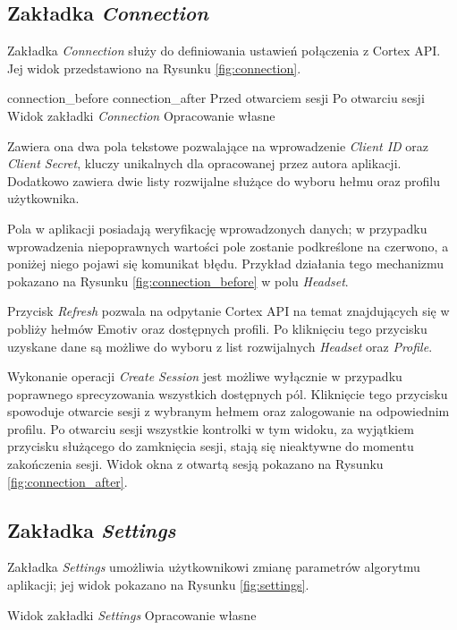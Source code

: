 \documentclass[skorowidz,skroty]{dyplomWEZUT}
\begin{document}
\subsection{Zakładka \textit{Connection}}
Zakładka \textit{Connection} służy do definiowania ustawień połączenia z Cortex API. Jej widok przedstawiono na Rysunku \vref{fig:connection}.

\rysunektwo
{connection_before}
{connection_after}
{Przed otwarciem sesji\label{fig:connection_before}}
{Po otwarciu sesji\label{fig:connection_after}}
{Widok zakładki \textit{Connection}\label{fig:connection}}
{Opracowanie własne}

Zawiera ona dwa pola tekstowe pozwalające na wprowadzenie \textit{Client ID} oraz \textit{Client Secret}, kluczy unikalnych dla opracowanej przez autora aplikacji. Dodatkowo zawiera dwie listy rozwijalne służące do wyboru hełmu oraz profilu użytkownika.

Pola w aplikacji posiadają weryfikację wprowadzonych danych; w przypadku wprowadzenia niepoprawnych wartości pole zostanie podkreślone na czerwono, a poniżej niego pojawi się komunikat błędu. Przykład działania tego mechanizmu pokazano na Rysunku \vref{fig:connection_before} w polu \textit{Headset}.

Przycisk \textit{Refresh} pozwala na odpytanie Cortex API na temat znajdujących się w pobliży hełmów Emotiv oraz dostępnych profili. Po kliknięciu tego przycisku uzyskane dane są możliwe do wyboru z list rozwijalnych \textit{Headset} oraz \textit{Profile}.

Wykonanie operacji \textit{Create Session} jest możliwe wyłącznie w przypadku poprawnego sprecyzowania wszystkich dostępnych pól. Kliknięcie tego przycisku spowoduje otwarcie sesji z wybranym hełmem oraz zalogowanie na odpowiednim profilu. Po otwarciu sesji wszystkie kontrolki w tym widoku, za wyjątkiem przycisku służącego do zamknięcia sesji, stają się nieaktywne do momentu zakończenia sesji. Widok okna z otwartą sesją pokazano na Rysunku \vref{fig:connection_after}.


\subsection{Zakładka \textit{Settings}\label{subsec:settings}}
Zakładka \textit{Settings} umożliwia użytkownikowi zmianę parametrów algorytmu aplikacji; jej widok pokazano na Rysunku \vref{fig:settings}.

{Widok zakładki \textit{Settings}\label{fig:settings}}
{Opracowanie własne}
\end{document}
